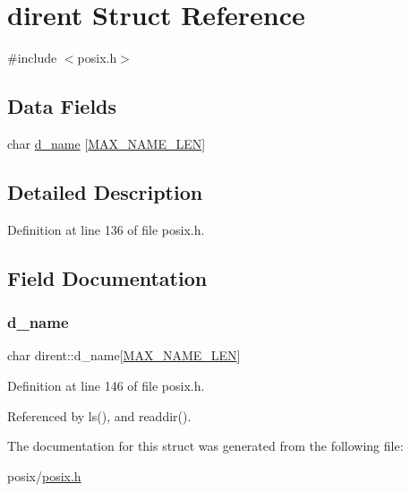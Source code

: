\hypertarget{structdirent}{}\section{dirent Struct Reference}
\label{structdirent}


{\ttfamily \#include $<$posix.\+h$>$}

\subsection*{Data Fields}
\begin{DoxyCompactItemize}
\item 
char \hyperlink{structdirent_ae61380f3ccbc6c32e8650d7bce76197b}{d\+\_\+name} \mbox{[}\hyperlink{posix_8h_afd709f201d7643c3909621f620ea648a}{M\+A\+X\+\_\+\+N\+A\+M\+E\+\_\+\+L\+EN}\mbox{]}
\end{DoxyCompactItemize}


\subsection{Detailed Description}


Definition at line 136 of file posix.\+h.



\subsection{Field Documentation}
\mbox{\label{structdirent_ae61380f3ccbc6c32e8650d7bce76197b}} 
\subsubsection{\texorpdfstring{d\+\_\+name}{d\_name}}
{\footnotesize\ttfamily char dirent\+::d\+\_\+name\mbox{[}\hyperlink{posix_8h_afd709f201d7643c3909621f620ea648a}{M\+A\+X\+\_\+\+N\+A\+M\+E\+\_\+\+L\+EN}\mbox{]}}



Definition at line 146 of file posix.\+h.



Referenced by ls(), and readdir().



The documentation for this struct was generated from the following file\+:\begin{DoxyCompactItemize}
\item 
posix/\hyperlink{posix_8h}{posix.\+h}\end{DoxyCompactItemize}
